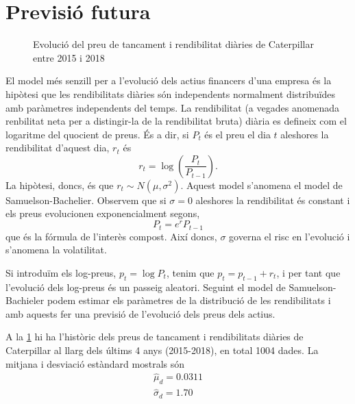 \documentclass{article}
\numberwithin{table}{section}
\numberwithin{figure}{section}
\numberwithin{equation}{section}
\begin{document}
\section{Previsió futura}
\begin{figure}[htb]
	\centering \sffamily \small
	
	\caption{Evolució del preu de tancament i rendibilitat diàries de Caterpillar entre 2015 i 2018}
	\label{fig:serie preus}
\end{figure}
El model més senzill per a l'evolució dels actius financers d'una empresa és la hipòtesi que les rendibilitats diàries són independents normalment distribuïdes amb paràmetres independents del temps. La rendibilitat (a vegades anomenada renbilitat neta per a distingir-la de la rendibilitat bruta) diària es defineix com el logaritme del quocient de preus. És a dir, si \( P_t \) és el preu el dia \( t \) aleshores la rendibilitat d'aquest dia, \( r_t \) és
\begin{equation*}
	r_t = \log{\left(\frac{P_t}{P_{t-1}}\right)}.
\end{equation*}
La hipòtesi, doncs, és que \( r_t \sim N(\mu, \sigma^2) \). Aquest model s'anomena el model de Samuelson-Bachelier. Observem que si \( \sigma = 0 \) aleshores la rendibilitat és constant i els preus evolucionen exponencialment segons,
\begin{equation*}
	P_t = e^{r}P_{t-1}
\end{equation*}
que és la fórmula de l'interès compost. Així doncs, \( \sigma \) governa el risc en l'evolució i s'anomena la volatilitat. 

Si introduïm els log-preus, \( p_t = \log{P_t} \), tenim que \( p_t = p_{t-1} + r_t \), i per tant que l'evolució dels log-preus és un passeig aleatori. Seguint el model de Samuelson-Bachieler podem estimar els paràmetres de la distribució de les rendibilitats i amb aquests fer una previsió de l'evolució dels preus dels actius.  

A la \cref{fig:serie preus} hi ha l'històric dels preus de tancament i rendibilitats diàries de Caterpillar al llarg dels últims 4 anys (2015-2018), en total 1004 dades. La mitjana i desviació estàndard mostrals són
\begin{equation}
	\begin{gather}
		\hat{\mu}_d = 0.0311 \\
		\hat{\sigma}_d	= 1.70 \\
	\end{gather}
\end{equation}
\end{document}
